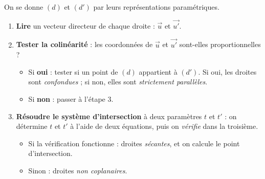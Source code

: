\documentclass[11pt]{article}
\begin{document}
\begin{methode}
On se donne $(d)$ et $(d')$ par leurs représentations paramétriques.
\begin{enumerate}
\item \textbf{Lire} un vecteur directeur de chaque droite : $\vec{u}$ et $\vec{u'}$.
\item \textbf{Tester la colinéarité} : les coordonnées de $\vec{u}$ et $\vec{u'}$ sont-elles proportionnelles ?
\begin{itemize}
\item Si \textbf{oui} : tester si un point de $(d)$ appartient à $(d')$. Si oui, les droites sont \emph{confondues} ; si non, elles sont \emph{strictement parallèles}.
\item Si \textbf{non} : passer à l'étape 3.
\end{itemize}
\item \textbf{Résoudre le système d'intersection} à deux paramètres $t$ et $t'$ : on détermine $t$ et $t'$ à l'aide de deux équations, puis on \emph{vérifie} dans la troisième.
\begin{itemize}
\item Si la vérification fonctionne : droites \emph{sécantes}, et on calcule le point d'intersection.
\item Sinon : droites \emph{non coplanaires}.
\end{itemize}
\end{enumerate}
\end{methode}
\end{document}
